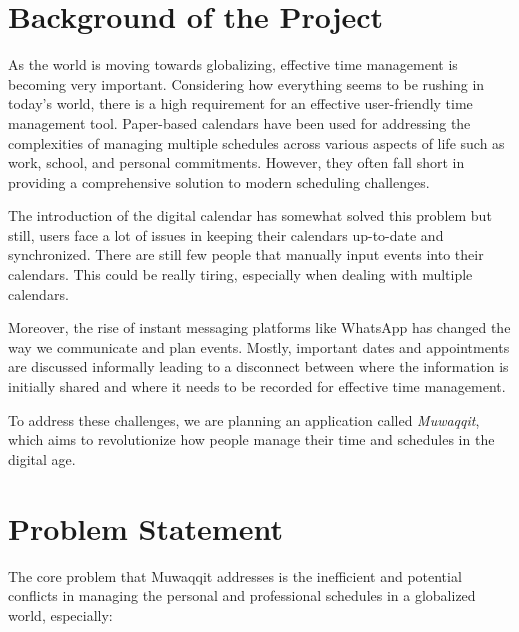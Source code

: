 \documentclass[12pt,a4paper]{article}
\begin{document}
\tableofcontents
\clearpage

\doublespacing

\section{Background of the Project}

As the world is moving towards globalizing, effective time management is becoming very important. Considering how everything seems to be rushing in today's world, there is a high requirement for an effective user-friendly time management tool. Paper-based calendars have been used for addressing the complexities of managing multiple schedules across various aspects of life such as work, school, and personal commitments. However, they often fall short in providing a comprehensive solution to modern scheduling challenges.

The introduction of the digital calendar has somewhat solved this problem but still, users face a lot of issues in keeping their calendars up-to-date and synchronized. There are still few people that manually input events into their calendars. This could be really tiring, especially when dealing with multiple calendars.

Moreover, the rise of instant messaging platforms like WhatsApp has changed the way we communicate and plan events. Mostly, important dates and appointments are discussed informally leading to a disconnect between where the information is initially shared and where it needs to be recorded for effective time management.

To address these challenges, we are planning an application called \textit{Muwaqqit}, which aims to revolutionize how people manage their time and schedules in the digital age.

\section{Problem Statement}

The core problem that Muwaqqit addresses is the inefficient and potential conflicts in managing the personal and professional schedules in a globalized world, especially:
\end{document}
